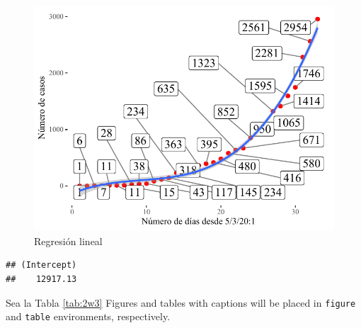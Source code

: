 \documentclass[10pt,]{krantz}
\let\oldincludegraphics\includegraphics
\renewcommand\includegraphics[2][]{%
  \oldincludegraphics[scale=0.85]{#2}
}
\theoremstyle{definition}
\theoremstyle{definition}
\theoremstyle{definition}
\theoremstyle{definition}
\theoremstyle{remark}
\begin{document}
\begin{figure}

{\centering \includegraphics{E_1_files/figure-latex/ww1w-1} 

}

\caption{Regresión lineal}\label{fig:ww1w}
\end{figure}

\begin{verbatim}
## (Intercept) 
##    12917.13
\end{verbatim}

Sea la Tabla \ref{tab:2w3} Figures and tables with captions will be placed in \texttt{figure} and \texttt{table} environments, respectively.
\end{document}
